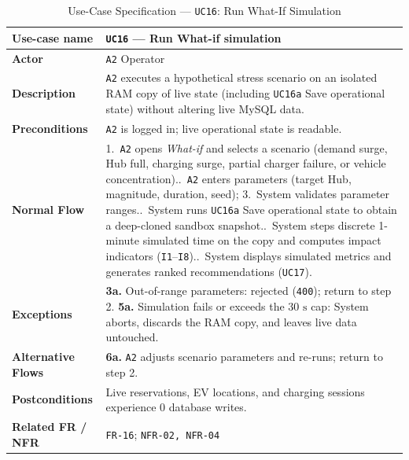 \begin{table}[H]
  \centering
  \singlespacing\footnotesize
  \caption{Use-Case Specification --- \texttt{UC16}: Run What-If Simulation}
  \label{tab:uc16}
  \renewcommand{\arraystretch}{1.13}
  \begin{tabularx}{\textwidth}{|L{2.9cm}|Y|}
    \hline
    \textbf{Use-case name} & \textbf{\texttt{UC16} --- Run What-if simulation} \\
    \hline
    \textbf{Actor} & \texttt{A2} Operator \\
    \hline
    \textbf{Description} & \texttt{A2} executes a hypothetical stress scenario on an isolated RAM copy of live state (including \texttt{UC16a} Save operational state) without altering live MySQL data. \\
    \hline
    \textbf{Preconditions} & \texttt{A2} is logged in; live operational state is readable. \\
    \hline
    \textbf{Normal Flow} & 1.\ \texttt{A2} opens \textit{What-if} and selects a scenario (demand surge, Hub full, charging surge, partial charger failure, or vehicle concentration)..\ \texttt{A2} enters parameters (target Hub, magnitude, duration, seed); 3.\ System validates parameter ranges..\ System runs \texttt{UC16a} Save operational state to obtain a deep-cloned sandbox snapshot..\ System steps discrete 1-minute simulated time on the copy and computes impact indicators (\texttt{I1}--\texttt{I8})..\ System displays simulated metrics and generates ranked recommendations (\texttt{UC17}). \\
    \hline
    \textbf{Exceptions} & \textbf{3a.} Out-of-range parameters: rejected (\texttt{400}); return to step 2.\newline
    \textbf{5a.} Simulation fails or exceeds the $30\text{ s}$ cap: System aborts, discards the RAM copy, and leaves live data untouched. \\
    \hline
    \textbf{Alternative Flows} & \textbf{6a.} \texttt{A2} adjusts scenario parameters and re-runs; return to step 2. \\
    \hline
    \textbf{Postconditions} & Live reservations, EV locations, and charging sessions experience $0$ database writes. \\
    \hline
    \textbf{Related FR / NFR} & \texttt{FR-16}; \texttt{NFR-02, NFR-04} \\
    \hline
  \end{tabularx}
\end{table}

